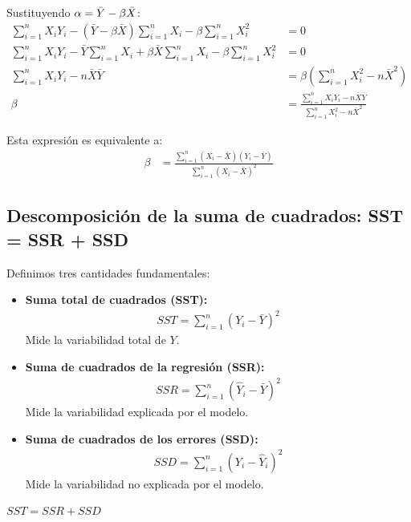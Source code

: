 Sustituyendo $\alpha = \bar{Y} - \beta \bar{X}$:
\begin{align}
	\sum_{i=1}^{n} X_i Y_i - (\bar{Y} - \beta \bar{X}) \sum_{i=1}^{n} X_i - \beta \sum_{i=1}^{n} X_i^2 &= 0 \\
	\sum_{i=1}^{n} X_i Y_i - \bar{Y} \sum_{i=1}^{n} X_i + \beta \bar{X} \sum_{i=1}^{n} X_i - \beta \sum_{i=1}^{n} X_i^2 &= 0 \\
	\sum_{i=1}^{n} X_i Y_i - n\bar{X}\bar{Y} &= \beta \left( \sum_{i=1}^{n} X_i^2 - n\bar{X}^2 \right) \\
	\beta &= \frac{\sum_{i=1}^{n} X_i Y_i - n\bar{X}\bar{Y}}{\sum_{i=1}^{n} X_i^2 - n\bar{X}^2}
\end{align}

Esta expresión es equivalente a:
\begin{align}
	\beta &= \frac{\sum_{i=1}^{n} (X_i - \bar{X})(Y_i - \bar{Y})}{\sum_{i=1}^{n} (X_i - \bar{X})^2}
\end{align}

\subsection{Descomposición de la suma de cuadrados: SST = SSR + SSD}

Definimos tres cantidades fundamentales:

\begin{itemize}
	\item \textbf{Suma total de cuadrados (SST):}
	\begin{align}
		SST = \sum_{i=1}^{n} (Y_i - \bar{Y})^2
	\end{align}
	Mide la variabilidad total de $Y$.
	
	\item \textbf{Suma de cuadrados de la regresión (SSR):}
	\begin{align}
		SSR = \sum_{i=1}^{n} (\hat{Y}_i - \bar{Y})^2
	\end{align}
	Mide la variabilidad explicada por el modelo.
	
	\item \textbf{Suma de cuadrados de los errores (SSD):}
	\begin{align}
		SSD = \sum_{i=1}^{n} (Y_i - \hat{Y}_i)^2
	\end{align}
	Mide la variabilidad no explicada por el modelo.
\end{itemize}

\begin{teorema}
	$SST = SSR + SSD$
\end{teorema}


